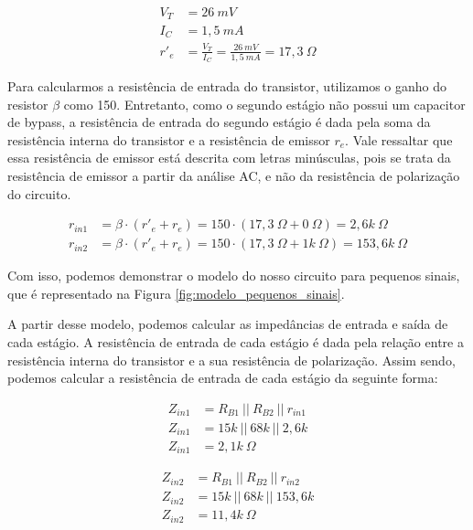\begin{align}
    V_T &= 26~mV \\
    I_C &= 1,5~mA \\
    r'_e &= \frac{V_T}{I_C} = \frac{26~mV}{1,5~mA} = 17,3~\Omega
\end{align}

Para calcularmos a resistência de entrada do transistor, utilizamos o ganho do resistor $\beta$ como 150. Entretanto, como o segundo estágio não possui um capacitor de bypass, a resistência de entrada do segundo estágio é dada pela soma da resistência interna do transistor e a resistência de emissor $r_e$. Vale ressaltar que essa resistência de emissor está descrita com letras minúsculas, pois se trata da resistência de emissor a partir da análise AC, e não da resistência de polarização do circuito.

\begin{align}
    r_{in1} &= \beta \cdot (r'_e + r_e) = 150 \cdot (17,3~\Omega + 0~\Omega) = 2,6k~\Omega \\
    r_{in2} &= \beta \cdot (r'_e + r_e) = 150 \cdot (17,3~\Omega + 1k~\Omega) = 153,6k~\Omega
\end{align}

Com isso, podemos demonstrar o modelo do nosso circuito para pequenos sinais, que é representado na Figura \ref{fig:modelo_pequenos_sinais}.


A partir desse modelo, podemos calcular as impedâncias de entrada e saída de cada estágio. A resistência de entrada de cada estágio é dada pela relação entre a resistência interna do transistor e a sua resistência de polarização. Assim sendo, podemos calcular a resistência de entrada de cada estágio da seguinte forma:

\begin{align}
    Z_{in1} &= R_{B1}~||~R_{B2}~||~r_{in1} \\
    Z_{in1} &= 15k~||~68k~||~2,6k \\
    Z_{in1} &= 2,1k~\Omega
\end{align}

\begin{align}
    Z_{in2} &= R_{B1}~||~R_{B2}~||~r_{in2} \\
    Z_{in2} &= 15k~||~68k~||~153,6k \\
    Z_{in2} &= 11,4k~\Omega
\end{align}

